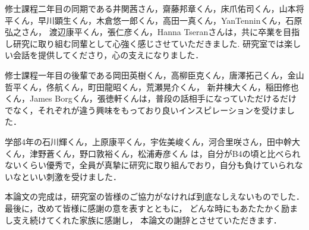 修士課程二年目の同期である井関茜さん，齋藤邦章くん，床爪佑司くん，山本将平くん，早川顕生くん，木倉悠一郎くん，高田一真くん，YanTenninくん，石原弘之さん，
渡辺康平くん，張仁彦くん，Hanna Tseranさんは，共に卒業を目指し研究に取り組む同輩として心強く感じさせていただきました.
研究室では楽しい会話を提供してくださり，心の支えになりました．

修士課程一年目の後輩である岡田英樹くん，高柳臣克くん，唐澤拓己くん，金山哲平くん，佟航くん，町田龍昭くん，荒瀬晃介くん，
新井棟大くん，稲田修也くん，James Borgくん，張徳軒くんは，普段の話相手になっていただけるだけでなく，それぞれが違う興味をもっており良いインスピレーションを受けました．

学部4年の石川輝くん，上原康平くん，宇佐美峻くん，河合里咲さん，田中幹大くん，津野蒼くん，野口敦裕くん，松浦寿彦くん
は，自分がB4の頃と比べられないくらい優秀で，全員が真摯に研究に取り組んでおり，自分も負けていられないなといい刺激を受けました．

本論文の完成は，研究室の皆様のご協力がなければ到底なしえないものでした．
最後に，改めて皆様に感謝の意を表すとともに，
どんな時にもあたたかく励まし支え続けてくれた家族に感謝し，
本論文の謝辞とさせていただきます．


